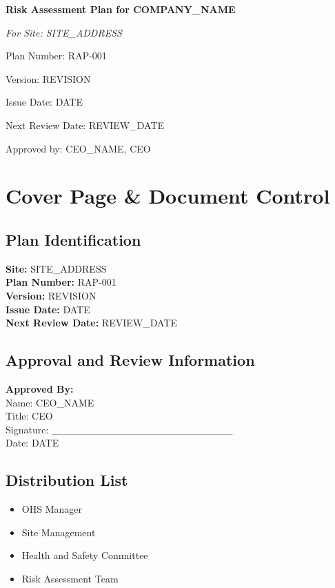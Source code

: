\documentclass[12pt]{article}
\begin{document}
\begin{titlepage}
    \centering
    \vspace*{2cm}
    {\LARGE\bfseries Risk Assessment Plan for {{COMPANY_NAME}}\par}
    \vspace{1cm}
    {\large\itshape For Site: {{SITE_ADDRESS}}\par}
    \vspace{0.5cm}
    {\normalsize Plan Number: RAP-001\par}
    \vspace{0.5cm}
    {\normalsize Version: {{REVISION}}\par}
    \vspace{0.5cm}
    {\normalsize Issue Date: {{DATE}}\par}
    \vspace{0.5cm}
    {\normalsize Next Review Date: {{REVIEW_DATE}}\par}
    \vspace{2cm}
    {\normalsize Approved by: {{CEO_NAME}}, CEO\par}
\end{titlepage}

\section{Cover Page \& Document Control}

\subsection{Plan Identification}
\textbf{Site:} {{SITE_ADDRESS}}\\
\textbf{Plan Number:} RAP-001\\
\textbf{Version:} {{REVISION}}\\
\textbf{Issue Date:} {{DATE}}\\
\textbf{Next Review Date:} {{REVIEW_DATE}}

\subsection{Approval and Review Information}
\textbf{Approved By:}\\
Name: {{CEO_NAME}}\\
Title: CEO\\
Signature: _________________________\\
Date: {{DATE}}

\subsection{Distribution List}
\begin{itemize}
    \item OHS Manager
    \item Site Management
    \item Health and Safety Committee
    \item Risk Assessment Team
\end{itemize}
\end{document}
